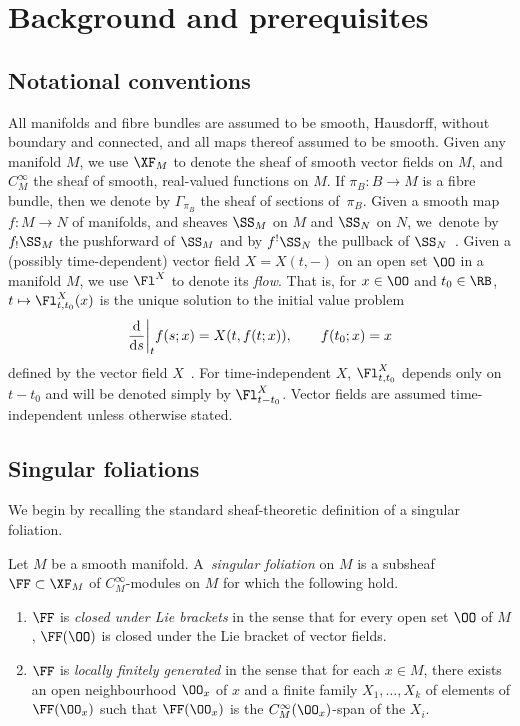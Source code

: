 \section{Background and prerequisites}\label{sec2}

\subsection{Notational conventions}

All manifolds and fibre bundles are assumed to be smooth, Hausdorff, without boundary and connected, and all maps thereof assumed to be smooth. Given any manifold $M$, we use $\XF_{M}$ to denote the sheaf of smooth vector fields on $M$, and $C^{\infty}_{M}$ the sheaf of smooth, real-valued functions on $M$. If $\pi_{B}\colon B\rightarrow M$ is a fibre bundle, then we denote by $\Gamma_{\pi_{B}}$ the sheaf of sections of~$\pi_{B}$. Given a smooth map $f\colon M\rightarrow N$ of manifolds, and sheaves $\SS_{M}$ on $M$ and $\SS_{N}$ on $N$, we~denote by $f_{!}\SS_{M}$ the pushforward of $\SS_{M}$ and by $f^{!}\SS_{N}$ the pullback of $\SS_{N}$~\cite[p.~65]{hartshorne}. Given a (possibly time-dependent) vector field $X = X(t,-)$ on an open set $\OO$ in a manifold $M$, we use $\Fl^{X}$ to denote its \textit{flow}. That is, for $x\in\OO$ and $t_{0}\in\RB$, $t\mapsto\Fl^{X}_{t,t_{0}}(x)$ is the unique solution to the initial value problem
\begin{gather*}
\frac{\rm d}{{\rm d}s}\bigg|_{t}f(s;x) = X(t,f(t;x)),\qquad f(t_{0};x) = x
\end{gather*}
defined by the vector field $X$~\cite[p.~236]{leesmth}. For time-independent $X$, $\Fl^{X}_{t,t_{0}}$ depends only on $t-t_{0}$ and will be denoted simply by $\Fl^{X}_{t-t_{0}}$. Vector fields are assumed time-independent unless otherwise stated.

\subsection{Singular foliations}

We begin by recalling the standard sheaf-theoretic definition of a singular foliation.

\begin{Definition}\label{singdef}
Let $M$ be a smooth manifold. A~\textit{singular foliation} on $M$ is a subsheaf $\FF\subset \XF_{M}$ of $C^{\infty}_{M}$-modules on $M$ for which the following hold.
\begin{enumerate}\itemsep=0pt
\item $\FF$ is \textit{closed under Lie brackets} in the sense that for every open set $\OO$ of $M$, $\FF(\OO)$ is closed under the Lie bracket of vector fields.
\item $\FF$ is \textit{locally finitely generated} in the sense that for each $x\in M$, there exists an open neighbourhood $\OO_{x}$ of $x$ and a finite family $X_{1},\dots,X_{k}$ of elements of $\FF(\OO_{x})$ such that $\FF(\OO_{x})$ is the $C^{\infty}_{M}(\OO_{x})$-span of the $X_{i}$.
\end{enumerate}
\end{Definition}

